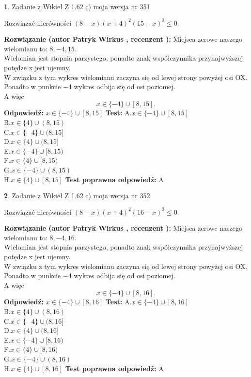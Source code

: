 \documentclass[12pt, a4paper]{article}
\theoremstyle{definition} %
\newtheorem{zad}{}
\newcommand{\zadStart}[1]{\begin{zad}#1\newline}
\newcommand{\zadStop}{\end{zad}}
\newcommand{\rozwStart}[2]{\noindent \textbf{Rozwiązanie (autor #1 , recenzent #2): }\newline}
\newcommand{\rozwStop}{\newline}
\newcommand{\odpStart}{\noindent \textbf{Odpowiedź:}\newline}
\newcommand{\odpStop}{\newline}
\newcommand{\testStart}{\noindent \textbf{Test:}\newline}
\newcommand{\testStop}{\newline}
\newcommand{\kluczStart}{\noindent \textbf{Test poprawna odpowiedź:}\newline}
\newcommand{\kluczStop}{\newline}
\begin{document}
\zadStart{Zadanie z Wikieł Z 1.62 c) moja wersja nr 351}

Rozwiązać nierówności $(8-x)(x+4)^{2}(15-x)^{3}\le0$.
\zadStop
\rozwStart{Patryk Wirkus}{}
Miejsca zerowe naszego wielomianu to: $8, -4, 15$.\\
Wielomian jest stopnia parzystego, ponadto znak współczynnika przy\linebreak najwyższej potędze x jest ujemny.\\ W związku z tym wykres wielomianu zaczyna się od lewej strony powyżej osi OX.\\
Ponadto w punkcie $-4$ wykres odbija się od osi poziomej.\\
A więc $$x \in \{-4\} \cup [8,15].$$
\rozwStop
\odpStart
$x \in \{-4\} \cup [8,15]$
\odpStop
\testStart
A.$x \in \{-4\} \cup [8,15]$\\
B.$x \in \{4\} \cup (8,15)$\\
C.$x \in \{-4\} \cup (8,15]$\\
D.$x \in \{4\} \cup (8,15]$\\
E.$x \in \{-4\} \cup [8,15)$\\
F.$x \in \{4\} \cup [8,15)$\\
G.$x \in \{-4\} \cup (8,15)$\\
H.$x \in \{4\} \cup [8,15]$
\testStop
\kluczStart
A
\kluczStop



\zadStart{Zadanie z Wikieł Z 1.62 c) moja wersja nr 352}

Rozwiązać nierówności $(8-x)(x+4)^{2}(16-x)^{3}\le0$.
\zadStop
\rozwStart{Patryk Wirkus}{}
Miejsca zerowe naszego wielomianu to: $8, -4, 16$.\\
Wielomian jest stopnia parzystego, ponadto znak współczynnika przy\linebreak najwyższej potędze x jest ujemny.\\ W związku z tym wykres wielomianu zaczyna się od lewej strony powyżej osi OX.\\
Ponadto w punkcie $-4$ wykres odbija się od osi poziomej.\\
A więc $$x \in \{-4\} \cup [8,16].$$
\rozwStop
\odpStart
$x \in \{-4\} \cup [8,16]$
\odpStop
\testStart
A.$x \in \{-4\} \cup [8,16]$\\
B.$x \in \{4\} \cup (8,16)$\\
C.$x \in \{-4\} \cup (8,16]$\\
D.$x \in \{4\} \cup (8,16]$\\
E.$x \in \{-4\} \cup [8,16)$\\
F.$x \in \{4\} \cup [8,16)$\\
G.$x \in \{-4\} \cup (8,16)$\\
H.$x \in \{4\} \cup [8,16]$
\testStop
\kluczStart
A
\kluczStop
\end{document}
